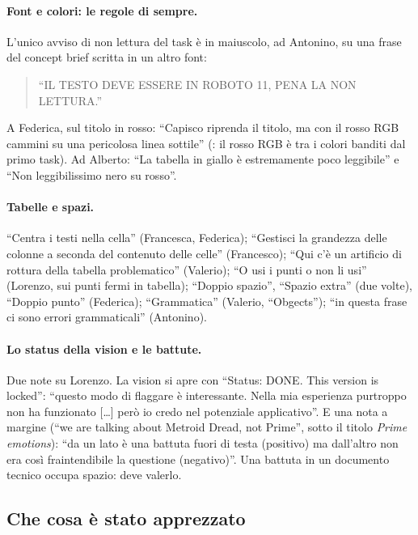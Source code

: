 \paragraph{Font e colori: le regole di sempre.} L'unico avviso di non lettura
del task è in maiuscolo, ad Antonino, su una frase del concept brief scritta
in un altro font:
\begin{quote}
  ``IL TESTO DEVE ESSERE IN ROBOTO 11, PENA LA NON LETTURA.'' \rvAvviso
\end{quote}
A Federica, sul titolo in rosso: ``Capisco riprenda il titolo, ma con il rosso
RGB cammini su una pericolosa linea sottile'' (\rvAvviso: il rosso RGB è tra i
colori banditi dal primo task). Ad Alberto: ``La tabella in giallo è
estremamente poco leggibile'' e ``Non leggibilissimo nero su rosso''.

\paragraph{Tabelle e spazi.} ``Centra i testi nella cella'' (Francesca,
Federica); ``Gestisci la grandezza delle colonne a seconda del contenuto delle
celle'' (Francesco); ``Qui c'è un artificio di rottura della tabella
problematico'' (Valerio); ``O usi i punti o non li usi'' (Lorenzo, sui punti
fermi in tabella); ``Doppio spazio'', ``Spazio extra'' (due volte), ``Doppio
punto'' (Federica); ``Grammatica'' (Valerio, ``Obgects''); ``in questa
frase ci sono errori grammaticali'' (Antonino).

\paragraph{Lo status della vision e le battute.} Due note su Lorenzo. La
vision si apre con ``Status: DONE. This version is locked'': ``questo modo di
flaggare è interessante. Nella mia esperienza purtroppo non ha funzionato
[\dots] però io credo nel potenziale applicativo''. E una nota a margine
(``we are talking about Metroid Dread, not Prime'', sotto il titolo
\emph{Prime emotions}): ``da un lato è una battuta fuori di testa (positivo)
ma dall'altro non era così fraintendibile la questione (negativo)''. Una
battuta in un documento tecnico occupa spazio: deve valerlo.

\subsection{Che cosa è stato apprezzato}
\label{rv:t5:sec:apprezzato}

